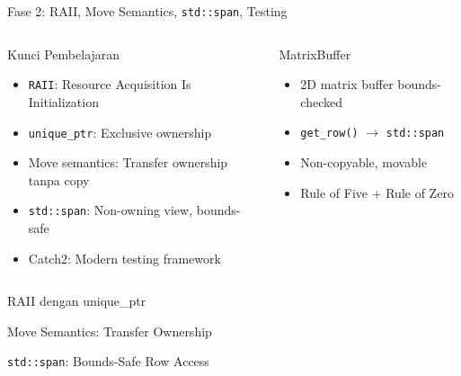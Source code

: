 \documentclass[aspectratio=169,10pt]{beamer}
\newcommand{\stdspan}{\texttt{std::span}}
\newcommand{\RAII}{\texttt{RAII}}
\begin{document}
\begin{frame}{Fase 2: RAII, Move Semantics, \stdspan, Testing}
  \begin{columns}[T]
    \begin{block}{Kunci Pembelajaran}
      \begin{itemize}
        \item \RAII: Resource Acquisition Is Initialization
        \item \texttt{unique\_ptr}: Exclusive ownership
        \item Move semantics: Transfer ownership tanpa copy
        \item \stdspan: Non-owning view, bounds-safe
        \item Catch2: Modern testing framework
      \end{itemize}
    \end{block}
    \begin{exampleblock}{MatrixBuffer}
      \begin{itemize}
        \item 2D matrix buffer bounds-checked
        \item \texttt{get\_row()} $\rightarrow$ \stdspan
        \item Non-copyable, movable
        \item Rule of Five + Rule of Zero
      \end{itemize}
    \end{exampleblock}
  \end{columns}
\end{frame}

\begin{frame}[fragile]{RAII dengan unique\_ptr}
  
\end{frame}

\begin{frame}[fragile]{Move Semantics: Transfer Ownership}
  
\end{frame}

\begin{frame}[fragile]{\stdspan: Bounds-Safe Row Access}
  
\end{frame}
\end{document}
